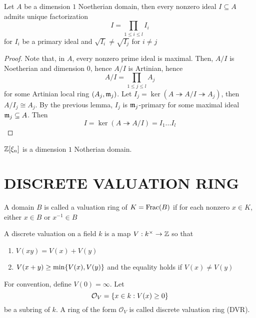 \begin{theorem}
	Let $A$ be a dimension $1$ Noetherian domain, then every nonzero ideal $I \subseteq A$ admits unique factorization
	$$
		I = \prod_{1 \leq i \leq l} I_i
	$$
	for $I_i$ be a primary ideal and $\sqrt{I_i} \neq \sqrt{I_j}$ for $i \neq j$
\end{theorem}

\begin{proof}
	Note that, in $A$, every nonzero prime ideal is maximal. Then, $A / I$ is Noetherian and dimension $0$, hence $A / I$ is Artinian, hence
	$$
		A / I = \prod_{1 \leq j \leq l} A_j
	$$
	for some Artinian local ring $(A_j, \mathfrak{m}_j)$. Let $I_j = \ker(A \twoheadrightarrow A / I \twoheadrightarrow A_j)$, then $A / I_j \cong A_j$. By the previous lemma, $I_j$ is $\mathfrak{m}_j$-primary for some maximal ideal $\mathfrak{m}_j \subseteq A$. Then
	$$
		I = \ker (A \twoheadrightarrow A / I) = I_1 ... I_l
	$$
\end{proof}

\begin{remark}
	$\mathbb{Z}[\xi_n]$ is a dimension $1$ Notherian domain.
\end{remark}

\section{DISCRETE VALUATION RING}

\begin{definition}
	A domain $B$ is called a valuation ring of $K = \operatorname{Frac}(B)$ if for each nonzero $x \in K$, either $x \in B$ or $x^{-1} \in B$
\end{definition}

\begin{definition}
	A discrete valuation on a field $k$ is a map $V: k^\times \to \mathbb{Z}$ so that
	\begin{enumerate}
		\item $V(xy) = V(x) + V(y)$
		\item $V(x + y) \geq \min\{V(x), V(y)\}$ and the equality holds if $V(x) \neq V(y)$
	\end{enumerate}
	
	For convention, define $V(0) = \infty$. Let
	$$
		\mathcal{O}_V = \{x \in k: V(x) \geq 0\}
	$$
	be a subring of $k$. A ring of the form $\mathcal{O}_V$ is called discrete valuation ring (DVR).
\end{definition}

